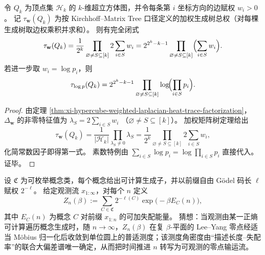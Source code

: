 \begin{theorem}[加权超立方体生成树的谱乘积闭式]\label{thm:xi-hypercube-weighted-spanning-tree-spectrum-product}
令 \(Q_k\) 为顶点集 \(\mathcal H_k\) 的 \(k\)-维超立方体图，并令每条第 \(i\) 坐标方向的边赋权 \(w_i>0\)。
记 \(\tau_{\mathbf w}(Q_k)\) 为按 Kirchhoff--Matrix Tree 口径定义的加权生成树总权（对每棵生成树取边权乘积并求和）。
则有完全闭式
\[
\tau_{\mathbf w}(Q_k)
=\frac{1}{2^k}\prod_{\varnothing\neq S\subseteq[k]}2\sum_{i\in S}w_i
=2^{2^k-k-1}\prod_{\varnothing\neq S\subseteq[k]}\Bigl(\sum_{i\in S}w_i\Bigr).
\]
若进一步取 \(w_i=\log p_i\)，则
\[
\tau_{\log p}(Q_k)
=2^{2^k-k-1}\prod_{\varnothing\neq S\subseteq[k]}\log\!\Bigl(\prod_{i\in S}p_i\Bigr).
\]
\end{theorem}
\begin{proof}
由定理 \ref{thm:xi-hypercube-weighted-laplacian-heat-trace-factorization}，
\(\Delta_{\mathbf w}\) 的非零特征值为
\(
\lambda_S=2\sum_{i\in S}w_i
\)
（\(\varnothing\neq S\subseteq[k]\)）。
加权矩阵树定理给出
\[
\tau_{\mathbf w}(Q_k)
=\frac{1}{|\mathcal H_k|}\prod_{\lambda_S\neq 0}\lambda_S
=\frac{1}{2^k}\prod_{\varnothing\neq S\subseteq[k]}2\sum_{i\in S}w_i,
\]
化简常数因子即得第一式。
素数特例由
\(
\sum_{i\in S}\log p_i=\log\prod_{i\in S}p_i
\)
直接代入。证毕。
\end{proof}



\begin{conjecture}\label{conj:xi-godel-weighted-leyang-universal-circle-law}
设 \(\mathfrak C\) 为可枚举概念类，每个概念给出可计算生成子，并以前缀自由 Gödel 码长 \(\ell\) 赋权 \(2^{-\ell}\)。
给定观测流 \(x_{1:\infty}\)，对每个 \(n\) 定义
\[
Z_n(\beta):=
\sum_{C\in\mathfrak C}
2^{-\ell(C)}\exp\!\bigl(-\beta E_C(n)\bigr),
\]
其中 \(E_C(n)\) 为概念 \(C\) 对前缀 \(x_{1:n}\) 的可加失配能量。
猜想：当观测由某一正熵可计算遍历概念生成时，随 \(n\to\infty\)，\(Z_n(\beta)\) 在复 \(\beta\)-平面的 Lee--Yang 零点经适当 Möbius 归一化后收敛到单位圆上的普适测度；该测度角密度由“描述长度--失配率”的联合大偏差谱唯一确定，从而把时间推进 \(n\) 转写为可观测的零点输运流。
\end{conjecture}

